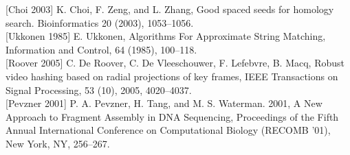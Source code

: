 \documentclass{article}
\begin{document}
{[}Choi 2003{]} K. Choi, F. Zeng, and L. Zhang, Good spaced seeds for
homology search. Bioinformatics 20 (2003), 1053--1056. \\

{[}Ukkonen 1985{]} E. Ukkonen, Algorithms For Approximate String
Matching, Information and Control, 64 (1985), 100--118. \\

{[}Roover 2005{]} C. De Roover, C. De Vleeschouwer, F. Lefebvre, B.
Macq, Robust video hashing based on radial projections of key frames,
IEEE Transactions on Signal Processing, 53 (10), 2005, 4020--4037. \\

{[}Pevzner 2001{]} P. A. Pevzner, H. Tang, and M. S. Waterman. 2001, A
New Approach to Fragment Assembly in DNA Sequencing, Proceedings of the
Fifth Annual International Conference on Computational Biology (RECOMB
'01), New York, NY, 256--267.
\end{document}
